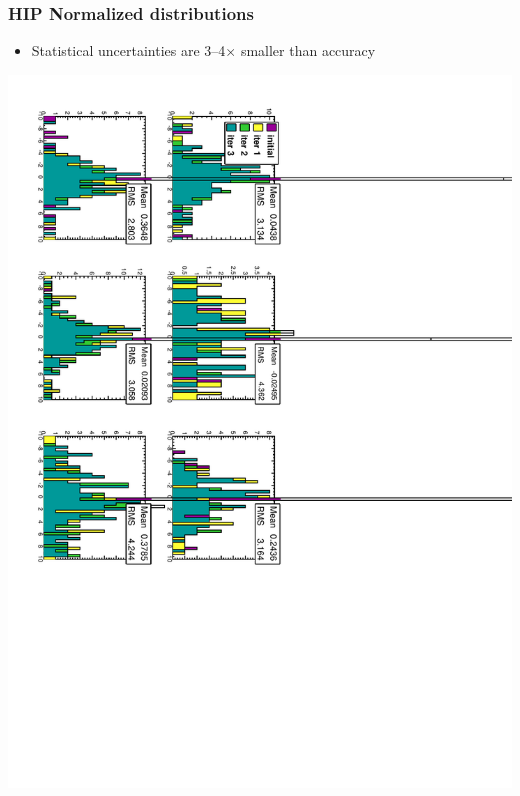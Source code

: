 \documentclass[compress]{beamer}
\begin{document}
\begin{frame}
\frametitle{HIP Normalized distributions}

\begin{itemize}
\item Statistical uncertainties are 3--4$\times$ smaller than accuracy
\end{itemize}

\vfill
\includegraphics[height=\linewidth, angle=90]{hip_MCnorm.pdf}
\end{frame}
\end{document}

